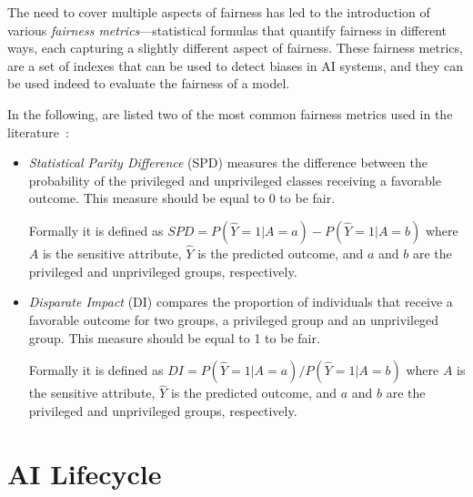 \documentclass[12pt,a4paper,openright,twoside]{book}
\begin{document}

The need to cover multiple aspects of fairness has led to the introduction of various \textit{fairness metrics}---statistical formulas that quantify fairness in different ways, each capturing a slightly different aspect of fairness.
%
These fairness metrics, are a set of indexes that can be used to detect biases in \ac{AI} systems, and they can be used indeed to evaluate the fairness of a model.
%


In the following, are listed two of the most common fairness metrics used in the literature~\cite{DBLP:conf/bias/IrfanML23}:

\begin{itemize}
    \item \textit{Statistical Parity Difference} (SPD) measures the difference between the probability of the privileged and unprivileged classes receiving a favorable outcome. This measure should be equal to 0 to be fair.
    
    Formally it is defined as $SPD = P(\hat{Y} = 1 | A = a) - P(\hat{Y} = 1 | A = b)$
    where $A$ is the sensitive attribute, $\hat{Y}$ is the predicted outcome, and $a$ and $b$ are the privileged and unprivileged groups, respectively.
    
    \item \textit{Disparate Impact} (DI) compares the proportion of individuals that receive a favorable outcome for two groups, a privileged group and an unprivileged group. This measure should be equal to 1 to be fair.
    
    Formally it is defined as $DI = P(\hat{Y} = 1 | A = a) / P(\hat{Y} = 1 | A = b)$
    where $A$ is the sensitive attribute, $\hat{Y}$ is the predicted outcome, and $a$ and $b$ are the privileged and unprivileged groups, respectively.    
\end{itemize}


\section{\acs{AI} Lifecycle}

\end{document}
